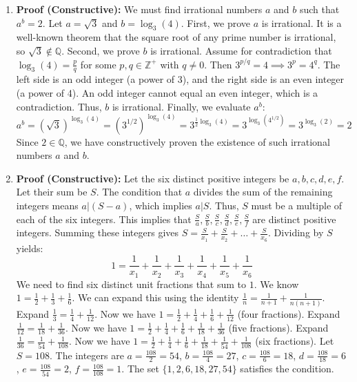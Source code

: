 \documentclass[11pt]{article}
\begin{document}
\begin{enumerate}
    \item \textbf{Proof (Constructive):} We must find irrational numbers $a$ and $b$ such that $a^b = 2$. Let $a = \sqrt{3}$ and $b = \log_3(4)$. 
    First, we prove $a$ is irrational. It is a well-known theorem that the square root of any prime number is irrational, so $\sqrt{3} \notin \mathbb{Q}$. 
    Second, we prove $b$ is irrational. Assume for contradiction that $\log_3(4) = \frac{p}{q}$ for some $p, q \in \mathbb{Z}^+$ with $q \neq 0$. Then $3^{p/q} = 4 \implies 3^p = 4^q$. The left side is an odd integer (a power of 3), and the right side is an even integer (a power of 4). An odd integer cannot equal an even integer, which is a contradiction. Thus, $b$ is irrational.
    Finally, we evaluate $a^b$:
    \[ a^b = (\sqrt{3})^{\log_3(4)} = (3^{1/2})^{\log_3(4)} = 3^{\frac{1}{2} \log_3(4)} = 3^{\log_3(4^{1/2})} = 3^{\log_3(2)} = 2 \]
    Since $2 \in \mathbb{Q}$, we have constructively proven the existence of such irrational numbers $a$ and $b$. \qedhere

    \item \textbf{Proof (Constructive):} Let the six distinct positive integers be $a, b, c, d, e, f$. Let their sum be $S$. The condition that $a$ divides the sum of the remaining integers means $a | (S - a)$, which implies $a | S$. Thus, $S$ must be a multiple of each of the six integers. This implies that $\frac{S}{a}, \frac{S}{b}, \frac{S}{c}, \frac{S}{d}, \frac{S}{e}, \frac{S}{f}$ are distinct positive integers. 
    Summing these integers gives $S = \frac{S}{x_1} + \frac{S}{x_2} + \dots + \frac{S}{x_6}$. Dividing by $S$ yields:
    \[ 1 = \frac{1}{x_1} + \frac{1}{x_2} + \frac{1}{x_3} + \frac{1}{x_4} + \frac{1}{x_5} + \frac{1}{x_6} \]
    We need to find six distinct unit fractions that sum to $1$. We know $1 = \frac{1}{2} + \frac{1}{3} + \frac{1}{6}$. We can expand this using the identity $\frac{1}{n} = \frac{1}{n+1} + \frac{1}{n(n+1)}$.
    Expand $\frac{1}{3} = \frac{1}{4} + \frac{1}{12}$. Now we have $1 = \frac{1}{2} + \frac{1}{4} + \frac{1}{6} + \frac{1}{12}$ (four fractions).
    Expand $\frac{1}{12} = \frac{1}{18} + \frac{1}{36}$. Now we have $1 = \frac{1}{2} + \frac{1}{4} + \frac{1}{6} + \frac{1}{18} + \frac{1}{36}$ (five fractions).
    Expand $\frac{1}{36} = \frac{1}{54} + \frac{1}{108}$. Now we have $1 = \frac{1}{2} + \frac{1}{4} + \frac{1}{6} + \frac{1}{18} + \frac{1}{54} + \frac{1}{108}$ (six fractions).
    Let $S = 108$. The integers are $a = \frac{108}{2} = 54$, $b = \frac{108}{4} = 27$, $c = \frac{108}{6} = 18$, $d = \frac{108}{18} = 6$, $e = \frac{108}{54} = 2$, $f = \frac{108}{108} = 1$. The set $\{1, 2, 6, 18, 27, 54\}$ satisfies the condition. \qedhere


\end{enumerate}
\end{document}
